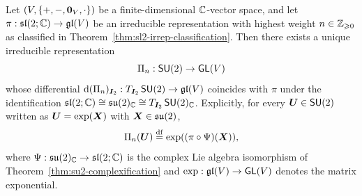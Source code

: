 \documentclass[11pt,reqno]{amsart}
\begin{document}
\begin{Thm}[Integration to $\SU(2)$]\label{thm:integration-SU2}
Let $\Br{V,\set{+,-,\bm0_V,\cdot}}$ be a finite-dimensional $\mathbb{C}$-vector space,
and let $\pi:\mathfrak{sl}(2;\mathbb{C})\to\mathfrak{gl}(V)$ be an irreducible representation with
highest weight $n\in\mathbb{Z}_{\geqslant 0}$ as classified in
Theorem~\ref{thm:sl2-irrep-classification}.
Then there exists a unique irreducible representation
\[
\Pi_n:\operatorname{\mathsf{SU}}(2)\to\operatorname{\mathsf{GL}}(V)
\]
whose differential $\mathrm{d}(\Pi_n)_{\bm I_2}:T_{\bm I_2}\operatorname{\mathsf{SU}}(2)\to\mathfrak{gl}(V)$
coincides with $\pi$ under the identification
$\mathfrak{sl}(2;\mathbb{C})\cong\mathfrak{su}(2)_{\mathbb{C}}\cong T_{\bm I_2}\operatorname{\mathsf{SU}}(2)_{\mathbb{C}}$.
Explicitly, for every $\bm U\in\operatorname{\mathsf{SU}}(2)$ written as
$\bm U=\exp\Br{\bm X}$ with $\bm X\in\mathfrak{su}(2)$,
\[
\Pi_n(\bm U)
\df\exp\Br{(\pi\circ\Psi)(\bm X)},
\]
where $\Psi:\mathfrak{su}(2)_{\mathbb{C}}\to\mathfrak{sl}(2;\mathbb{C})$ is the complex Lie algebra isomorphism of
Theorem~\ref{thm:su2-complexification}
and $\exp:\mathfrak{gl}(V)\to\operatorname{\mathsf{GL}}(V)$ denotes the matrix exponential.
\end{Thm}
\end{document}
